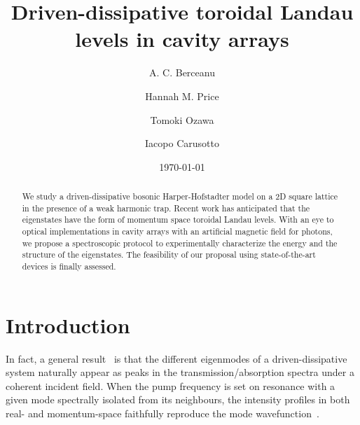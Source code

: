 \documentclass[twocolumn, 10pt, aps, superscriptaddress, floatfix, showpacs, pra, citeautoscript]{revtex4-1}
\begin{document}
\title{Driven-dissipative toroidal Landau levels in cavity arrays}


\author{A. C. Berceanu}
\author{Hannah M. Price}
\author{Tomoki Ozawa}
\author{Iacopo Carusotto}

\date{\today}

\begin{abstract}
  We study a driven-dissipative bosonic Harper-Hofstadter model on a
  2D square lattice in the presence of a weak harmonic trap. Recent
  work has anticipated that the eigenstates have the form of momentum
  space toroidal Landau levels. With an eye to optical implementations
  in cavity arrays with an artificial magnetic field for photons, we
  propose a spectroscopic protocol to experimentally characterize the
  energy and the structure of the eigenstates. The feasibility of our
  proposal using state-of-the-art devices is finally assessed.
\end{abstract}

\maketitle


\section{Introduction}
In fact, a general result~\cite{RMP} is that the different eigenmodes
of a driven-dissipative system naturally appear as peaks in the
transmission/absorption spectra under a coherent incident field. When
the pump frequency is set on resonance with a given mode spectrally
isolated from its neighbours, the intensity profiles in both real- and
momentum-space faithfully reproduce the mode wavefunction~\cite{RMP}.
\end{document}
